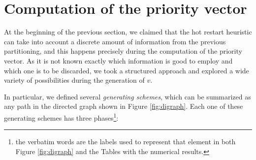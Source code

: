 \section{Computation of the priority vector}

At the beginning of the previous section, we claimed that the hot restart heuristic can take into account a discrete amount of information from the previous partitioning, and this happens precisely during the computation of the priority vector. As it is not known exactly which information is good to employ and which one is to be discarded, we took a structured approach and explored a wide variety of possibilities during the generation of $v$.

In particular, we defined several \emph{generating schemes}, which can be summarized as any path in the directed graph shown in Figure \ref{fig:digraph}. Each one of these generating schemes has three phases\footnote{the verbatim words are the labels used to represent that element in both Figure \ref{fig:digraph} and the Tables with the numerical results.}:

